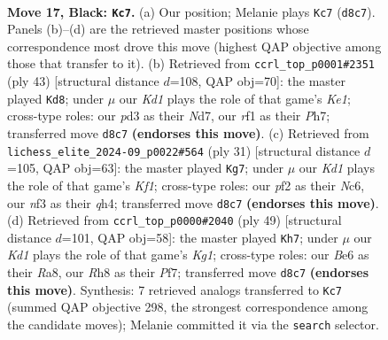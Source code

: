 \documentclass[11pt]{article}
\begin{document}
\clearpage

\begin{figure}[p]\centering
\begin{subfigure}{0.46\textwidth}\centering
\resizebox{\linewidth}{!}{%
\newchessgame
\chessboard[
  setfen={r2k3r/pp3p1p/2n1bN2/4p1Q1/3p4/2qP1N2/P4PPP/5RK1 b - - 3 17},
  showmover=false,
  pgfstyle=straightmove, color=movearrow, markmove={d8-c7}
]}
\caption{}
\end{subfigure}\hfill
\begin{subfigure}{0.46\textwidth}\centering
\resizebox{\linewidth}{!}{%
\newchessgame
\chessboard[
  setfen={4k2r/3n1p1p/r1q2p2/2b1p3/P2p2Q1/5N2/5PPP/1RBR2K1 b k - 3 22},
  showmover=false,
  pgfstyle=straightmove, color=movearrow, markmove={e8-d8}
]}
\caption{}
\end{subfigure}
\\[4pt]
\begin{subfigure}{0.46\textwidth}\centering
\resizebox{\linewidth}{!}{%
\newchessgame
\chessboard[
  setfen={r4k1r/pp3p1p/2n1bp2/2q1p3/7Q/2P2NP1/P3PPBP/2R1K2R b K - 4 16},
  showmover=false,
  pgfstyle=straightmove, color=movearrow, markmove={f8-g7}
]}
\caption{}
\end{subfigure}\hfill
\begin{subfigure}{0.46\textwidth}\centering
\resizebox{\linewidth}{!}{%
\newchessgame
\chessboard[
  setfen={r5k1/2qn1pp1/1p2n2p/5N2/1PPp4/3N3P/5PP1/2Q1R1K1 b - - 4 25},
  showmover=false,
  pgfstyle=straightmove, color=movearrow, markmove={g8-h7}
]}
\caption{}
\end{subfigure}
\caption{\textbf{Move 17, Black: \texttt{Kc7}.} (a) Our position; Melanie plays \texttt{Kc7} (\texttt{d8c7}). Panels (b)--(d) are the retrieved master positions whose correspondence most drove this move (highest QAP objective among those that transfer to it). (b) Retrieved from \texttt{ccrl\_top\_p0001\#2351} (ply 43) [structural distance $d$=108, QAP obj=70]: the master played \texttt{Kd8}; under $\mu$ our \emph{Kd1} plays the role of that game's \emph{Ke1}; cross-type roles: our \emph{p}d3 as their \emph{N}d7, our \emph{r}f1 as their \emph{P}h7; transferred move \texttt{d8c7} \textbf{(endorses this move)}. (c) Retrieved from \texttt{lichess\_elite\_2024-09\_p0022\#564} (ply 31) [structural distance $d$=105, QAP obj=63]: the master played \texttt{Kg7}; under $\mu$ our \emph{Kd1} plays the role of that game's \emph{Kf1}; cross-type roles: our \emph{p}f2 as their \emph{N}c6, our \emph{n}f3 as their \emph{q}h4; transferred move \texttt{d8c7} \textbf{(endorses this move)}. (d) Retrieved from \texttt{ccrl\_top\_p0000\#2040} (ply 49) [structural distance $d$=101, QAP obj=58]: the master played \texttt{Kh7}; under $\mu$ our \emph{Kd1} plays the role of that game's \emph{Kg1}; cross-type roles: our \emph{B}e6 as their \emph{R}a8, our \emph{R}h8 as their \emph{P}f7; transferred move \texttt{d8c7} \textbf{(endorses this move)}. Synthesis: 7 retrieved analogs transferred to \texttt{Kc7} (summed QAP objective 298, the strongest correspondence among the candidate moves); Melanie committed it via the \texttt{search} selector.}
\label{fig:thought-m33}
\end{figure}
\end{document}
